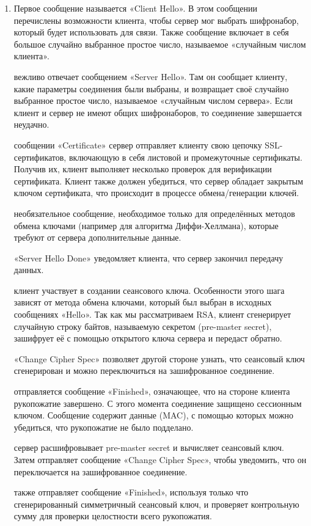 \begin{enumerate}

\item Первое сообщение называется «Client Hello». В этом сообщении перечислены возможности клиента, чтобы сервер мог выбрать шифронабор, который будет использовать для связи. Также сообщение включает в себя большое случайно выбранное простое число, называемое «случайным числом клиента».

 вежливо отвечает сообщением «Server Hello». Там он сообщает клиенту, какие параметры соединения были выбраны, и возвращает своё случайно выбранное простое число, называемое «случайным числом сервера». Если клиент и сервер не имеют общих шифронаборов, то соединение завершается неудачно.

 сообщении «Certificate» сервер отправляет клиенту свою цепочку SSL-сертификатов, включающую в себя листовой и промежуточные сертификаты. Получив их, клиент выполняет несколько проверок для верификации сертификата. Клиент также должен убедиться, что сервер обладает закрытым ключом сертификата, что происходит в процессе обмена/генерации ключей.

 необязательное сообщение, необходимое только для определённых методов обмена ключами (например для алгоритма Диффи-Хеллмана), которые требуют от сервера дополнительные данные.

 «Server Hello Done» уведомляет клиента, что сервер закончил передачу данных.

 клиент участвует в создании сеансового ключа. Особенности этого шага зависят от метода обмена ключами, который был выбран в исходных сообщениях «Hello». Так как мы рассматриваем RSA, клиент сгенерирует случайную строку байтов, называемую секретом (pre-master secret), зашифрует её с помощью открытого ключа сервера и передаст обратно.

 «Change Cipher Spec» позволяет другой стороне узнать, что сеансовый ключ сгенерирован и можно переключиться на зашифрованное соединение.

 отправляется сообщение «Finished», означающее, что на стороне клиента рукопожатие завершено. С этого момента соединение защищено сессионным ключом. Сообщение содержит данные (MAC), с помощью которых можно убедиться, что рукопожатие не было подделано.

 сервер расшифровывает pre-master secret и вычисляет сеансовый ключ. Затем отправляет сообщение «Change Cipher Spec», чтобы уведомить, что он переключается на зашифрованное соединение.

 также отправляет сообщение «Finished», используя только что сгенерированный симметричный сеансовый ключ, и проверяет контрольную сумму для проверки целостности всего     рукопожатия.

\end{enumerate}

